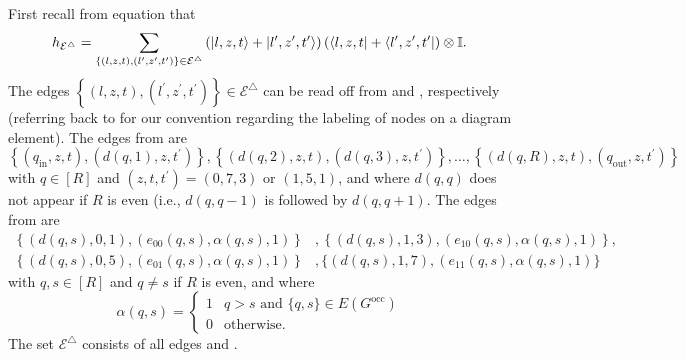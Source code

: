 \documentclass[../thesis-main/thesis-main]{subfiles}
\begin{document}
First recall from equation  that
\begin{equation}
h_{\mathcal{E}^{\triangle}}=\sum_{\left\{ (l,z,t),(l^{\prime},z^{\prime},t^{\prime})\right\} \in\mathcal{E}^{\triangle}}\left(|l,z,t\rangle+|l^{\prime},z^{\prime},t^{\prime}\rangle\right)\left(\langle l,z,t|+\langle l^{\prime},z^{\prime},t^{\prime}|\right)\otimes\mathbb{I}.\label{eq:equation_for_h_epsilon_triangle}
\end{equation}
The edges $\left\{ (l,z,t),(l^{\prime},z^{\prime},t^{\prime})\right\} \in\mathcal{E}^{\triangle}$ can be read off from  and , respectively (referring back to  for our convention regarding the labeling of nodes on a diagram element). The edges from  are
\begin{equation}
\left\{ (q_{\mathrm{in}},z,t),(d(q,1),z,t^{\prime})\right\} ,\left\{ (d(q,2),z,t),(d(q,3),z,t^{\prime})\right\} ,\ldots,\left\{ (d(q,R),z,t),(q_{\mathrm{out}},z,t^{\prime})\right\} \label{eq:epsilon_triangle_set1}
\end{equation}
with $q\in[R]$ and $\left(z,t,t^{\prime}\right)=(0,7,3)\text{ or }(1,5,1)$, 
and where $d(q,q)$ does not appear if $R$ is even (i.e., $d(q,q-1)$ is followed by $d(q,q+1)$. The edges from  are 
\begin{align}
\left\{ \left(d(q,s),0,1\right),(e_{00}(q,s),\alpha(q,s),1)\right\}  & ,\left\{ \left(d(q,s),1,3\right),(e_{10}(q,s),\alpha(q,s),1)\right\}, \label{eq:epsilon_triangle_set2}\\
\left\{ \left(d(q,s),0,5\right),(e_{01}(q,s),\alpha(q,s),1)\right\}  & ,\{\left(d(q,s),1,7\right),(e_{11}(q,s),\alpha(q,s),1)\}\nonumber 
\end{align}
with $q,s\in[R]$ and $q\neq s$ if $R$ is even, and where 
\[
\alpha(q,s)=\begin{cases}
1 & q>s\text{ and }\{q,s\}\in E(G^{\text{occ}})\\
0 & \text{otherwise}.
\end{cases}
\]
The set $\mathcal{E}^{\triangle}$ consists of all edges  and .
\end{document}
